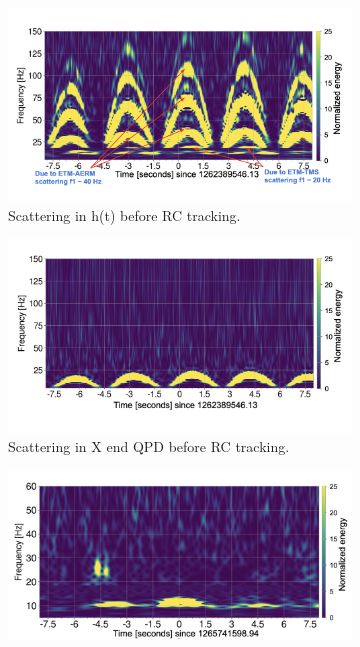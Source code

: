 \documentclass[12pt]{iopart}
\begin{document}
\begin{figure}[h]
\captionsetup[subfigure]{font=scriptsize,labelfont=scriptsize}
   \centering
    \begin{subfigure}[b]{0.45\textwidth}
        \centering
         \includegraphics[width= \textwidth]{1262389546darm_new.png}
         \caption{Scattering in h(t) before RC tracking.}
         \label{fig:1262darm}
    \end{subfigure}
    \begin{subfigure}[b]{0.45\textwidth}
        \centering
         \includegraphics[width =\textwidth]{1262389546trans_new.png}
         \caption{Scattering in X end QPD before RC tracking.}
         \label{fig:1262trans}
     \end{subfigure}
     \par\bigskip
      \begin{subfigure}[b]{0.45\textwidth}
        \centering
         \includegraphics[width= \textwidth]{post_r0_darmomeg2.png}

\end{subfigure}
\end{figure}
\end{document}

